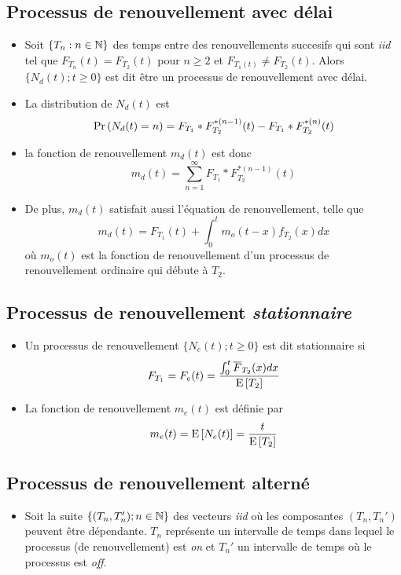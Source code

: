 \documentclass[10pt, french, landscape]{article}
\begin{document}
\begin{multicols*}{3}
\subsection*{Processus de renouvellement avec délai}
\begin{itemize}
\item Soit $\{ T_n : n \in \mathbb{N} \}$ des temps entre des renouvellements succesifs qui sont \emph{iid} tel que $F_{T_n}(t) = F_{T_2}(t)$ pour $n \geq 2$ et $F_{T_1(t)} \neq F_{T_2}(t)$. Alors $\{N_d(t) ; t \geq 0 \}$ est dit être un processus de renouvellement avec délai. 

\item La distribution de $N_d(t)$ est
\[\Pr \left( N_d(t) = n \right) = F_{T_1} \ast F_{T_2}^{\ast(n-1)}(t) - F_{T_1} \ast F_{T_2}^{\ast (n)}(t)  \]

\item la fonction de renouvellement $m_d(t)$ est donc
\[m_d(t) = \sum_{n=1}^{\infty} F_{T_1} \ast F_{T_2}^{\ast (n-1)}(t)  \]

\item De plus, $m_d(t)$ satisfait aussi l'équation de renouvellement, telle que
\[m_d(t) = F_{T_1}(t) + \int_{0}^{t}  m_o(t-x) f_{T_2}(x) dx \]
où $m_o(t)$ est la fonction de renouvellement d'un processus de renouvellement ordinaire qui débute à $T_2$.
\end{itemize}

\subsection*{Processus de renouvellement \emph{stationnaire}}
\begin{itemize}
\item Un processus de renouvellement $\{ N_e(t) ; t \geq 0 \}$ est dit stationnaire si
\[F_{T_1} = F_e(t) = \frac{\int_{0}^{t} \overline{F}_{T_2}(x) dx  }{\mathrm{E} \left[ T_2 \right]}\]

\item La fonction de renouvellement $m_e(t)$ est définie par
\[m_e(t) = \mathrm{E} \left[ N_e(t) \right] = \frac{t}{\mathrm{E} \left[ T_2 \right]} \]
\end{itemize}

\subsection*{Processus de renouvellement alterné}
\begin{itemize}
\item Soit la suite $\{ (T_n, T_n') ; n \in \mathbb{N} \}$ des vecteurs \emph{iid} où les composantes $(T_n, T_n')$ peuvent être dépendante. $T_n$ représente un intervalle de temps dans lequel le processus (de renouvellement) est \emph{on} et $T_n'$ un intervalle de temps où le processus est \emph{off}.


\end{itemize}
\end{multicols*}
\end{document}
